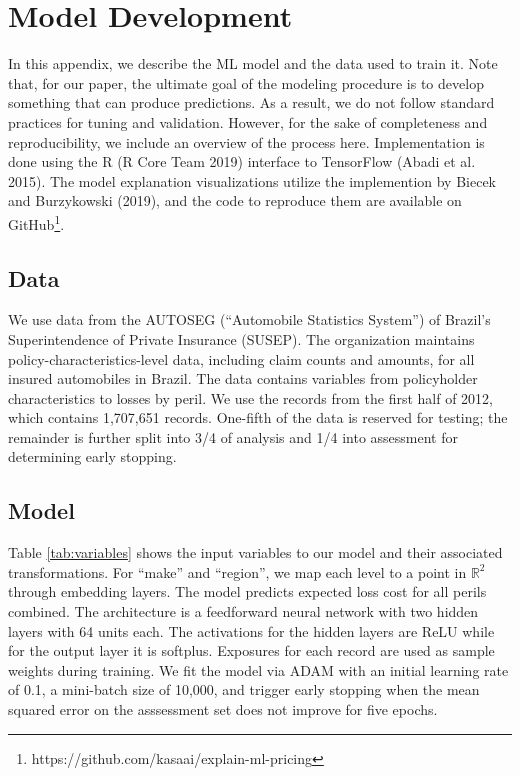\documentclass[preprint, 3p, twocolumn, letterpaper, 10pt]{elsarticle} %
\begin{document}
\hypertarget{model-dev}{%
\section{Model Development}\label{model-dev}}

In this appendix, we describe the ML model and the data used to train it. Note
that, for our paper, the ultimate goal of the modeling procedure is to develop
something that can produce predictions. As a result, we do not follow standard
practices for tuning and validation. However, for the sake of
completeness and reproducibility, we include an overview of the process here.
Implementation is done using the R (R Core Team 2019) interface to TensorFlow
(Abadi et al. 2015). The model explanation visualizations utilize the
implemention by Biecek and Burzykowski (2019), and the code to reproduce them are available on
GitHub\footnote{https://github.com/kasaai/explain-ml-pricing}.

\hypertarget{data}{%
\subsection{Data}\label{data}}

We use data from the AUTOSEG (``Automobile Statistics System'') of Brazil's
Superintendence of Private Insurance (SUSEP). The organization maintains
policy-characteristics-level data, including claim counts and amounts, for all
insured automobiles in Brazil. The data contains variables from policyholder
characteristics to losses by peril. We use the records from the first half of
2012, which contains 1,707,651 records. One-fifth of the data is reserved for
testing; the remainder is further split into 3/4 of analysis and 1/4 into
assessment for determining early stopping.

\hypertarget{model}{%
\subsection{Model}\label{model}}

Table \ref{tab:variables} shows the input variables to our model and their
associated transformations. For ``make'' and ``region'', we map each level to a
point in \(\mathbb{R}^2\) through embedding layers. The model predicts expected
loss cost for all perils combined. The architecture is a feedforward
neural network with two hidden layers with 64 units each. The activations for
the hidden layers are ReLU while for the output layer it is softplus. Exposures
for each record are used as sample weights during training. We fit the model
via ADAM with an initial learning rate of 0.1, a mini-batch size of 10,000,
and trigger early stopping when the mean squared error on the asssessment set
does not improve for five epochs.
\end{document}
